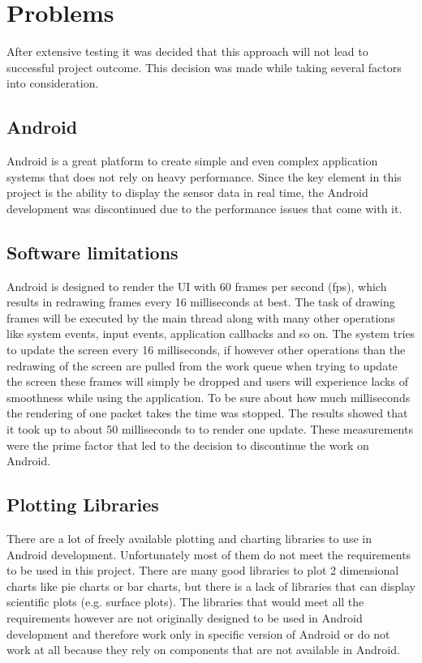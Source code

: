 \chapter{Problems}
\label{ch:Problems}

After extensive testing it was decided that this approach will not lead to successful project outcome. This decision was made while taking several factors into consideration.

\section{Android}
Android is a great platform to create simple and even complex application systems that does not rely on heavy performance. Since the key element in this project is the ability to display the sensor data in real time, the Android development was discontinued due to the performance issues that come with it.

\section{Software limitations}
Android is designed to render the UI with 60 frames per second (fps), which results in redrawing frames every 16 milliseconds at best. The task of drawing frames will be executed by the main thread along with many other operations like system events, input events, application callbacks and so on. The system tries to update the screen every 16 milliseconds, if however other operations than the redrawing of the screen are pulled from the work queue when trying to update the screen these frames will simply be dropped and users will experience lacks of smoothness while using the application. To be sure about how much milliseconds the rendering of one packet takes the time was stopped. The results showed that it took up to about 50 milliseconds to to render one update. These measurements were the prime factor that led to the decision to discontinue the work on Android.

\section{Plotting Libraries}
There are a lot of freely available plotting and charting libraries to use in Android development. Unfortunately most of them do not meet the requirements to be used in this project. There are many good libraries to plot 2 dimensional charts like pie charts or bar charts, but there is a lack of libraries that can display scientific plots (e.g. surface plots). The libraries that would meet all the requirements however are not originally designed to be used in Android development and therefore work only in specific version of Android or do not work at all because they rely on components that are not available in Android.

